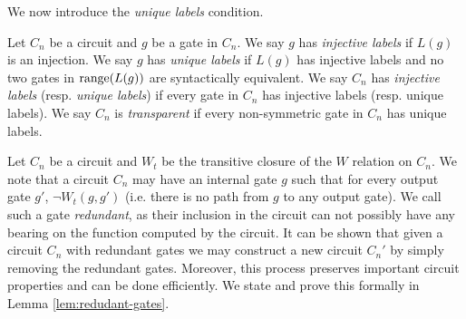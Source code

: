 \documentclass[../paper.tex]{subfiles}
\begin{document}
We now introduce the \emph{unique labels} condition.

\begin{definition}
  Let $C_n$ be a circuit and $g$ be a gate in $C_n$. We say $g$ has
  \emph{injective labels} if $L(g)$ is an injection. We say $g$ has \emph{unique
    labels} if $L(g)$ has injective labels and no two gates in $\text{range}(L(g))$
  are syntactically equivalent. We say $C_n$ has \emph{injective labels} (resp.
  \emph{unique labels}) if every gate in $C_n$ has injective labels (resp.
  unique labels). We say $C_n$ is \emph{transparent} if every non-symmetric gate
  in $C_n$ has unique labels.
\end{definition}

Let $C_n$ be a circuit and $W_t$ be the transitive closure of the $W$ relation
on $C_n$. We note that a circuit $C_n$ may have an internal gate $g$ such that
for every output gate $g'$, $\neg W_t(g, g')$ (i.e. there is no path from $g$ to
any output gate). We call such a gate \emph{redundant}, as their inclusion in
the circuit can not possibly have any bearing on the function computed by the
circuit. It can be shown that given a circuit $C_n$ with redundant gates we may
construct a new circuit $C_n'$ by simply removing the redundant gates. Moreover,
this process preserves important circuit properties and can be done efficiently.
We state and prove this formally in Lemma \ref{lem:redudant-gates}.


\end{document}
